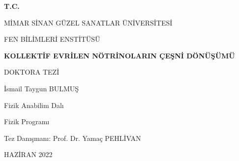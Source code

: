 \documentclass[a4paper,12pt,oneside]{book}
\begin{document}
\begin{titlepage}
	\centering
	\setlength{\topmargin}{0cm}
	\begin{Large}\bfseries
	T.C.\par
	MİMAR SİNAN GÜZEL SANATLAR ÜNİVERSİTESİ\par
	FEN BİLİMLERİ ENSTİTÜSÜ\par
	\end{Large}
	\vspace{4.5cm}
	\begin{large}\bfseries
		KOLLEKTİF EVRİLEN NÖTRİNOLARIN ÇEŞNİ DÖNÜŞÜMÜ\par
	\vspace{2cm}
	DOKTORA TEZİ\par
	\vspace{0.5cm}
	İsmail Taygun BULMUŞ\par
	\vspace{3cm}
	Fizik Anabilim Dalı\par
	\vspace{0.5cm}
	Fizik Programı\par
	\vspace{2cm}
	Tez Danışmanı: Prof. Dr. Yamaç PEHLİVAN\par
	\vspace{3cm}
	HAZİRAN 2022\par
	\end{large}
	\vfill
\end{titlepage}

\thispagestyle{empty}
\mbox{}
\newcommand{\blankpage}{
\newpage
\thispagestyle{empty}
\mbox{}
\newpage
}

\newpage
 
\newpage

\titleformat{\chapter}{\Large\bfseries}{\thechapter}{12pt}{}
\titleformat{\section}{\large\bfseries}{\thesection}{12pt}{}
\titleformat{\subsection}{\large\bfseries}{\thesubsection}{12pt}{}
\titleformat{\appendix}{\Large\bfseries}{\appendix}{12pt}{}
\titleformat{\tableofcontents}{\Large\bfseries}{\tableofcontents}{12pt}{}
\titleformat{\listoffigures}{\Large\bfseries}{\thelistoffigures}{12pt}{}
\frontmatter
\end{document}
